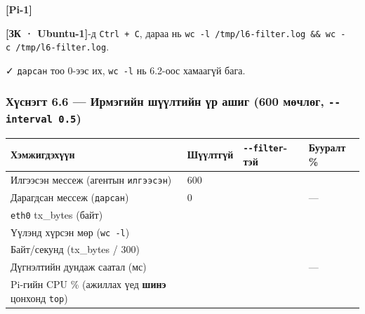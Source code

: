 \textbf{{[}Pi-1{]}}

\begin{Shaded}
\begin{Highlighting}[]
\VariableTok{)}
 \KeywordTok{\textbackslash{}}
    \KeywordTok{\textbackslash{}}
\VariableTok{)}
 \VariableTok{$((}\VariableTok{))} \KeywordTok{|} 
\end{Highlighting}
\end{Shaded}

\textbf{{[}ЗК · Ubuntu-1{]}}-д \texttt{Ctrl\ +\ C}, дараа нь \texttt{wc\ -l\ /\allowbreak{}tmp/\allowbreak{}l6-filter.\allowbreak{}log\ \&\allowbreak{}\&\allowbreak{}\ wc\ -c\ /\allowbreak{}tmp/\allowbreak{}l6-filter.\allowbreak{}log}.

✓ \texttt{дарсан} тоо 0-ээс их, \texttt{wc\ -l} нь 6.2-оос хамаагүй бага.

\hypertarget{ux445ux4afux441ux43dux44dux433ux442-6.6-ux438ux440ux43cux44dux433ux438ux439ux43d-ux448ux4afux4afux43bux442ux438ux439ux43d-ux4afux440-ux430ux448ux438ux433-600-ux43cux4e9ux447ux43bux4e9ux433---interval-0.5}{%
\subsubsection{\texorpdfstring{Хүснэгт 6.6 --- Ирмэгийн шүүлтийн үр ашиг (600 мөчлөг, \texttt{-\/\allowbreak{}-interval\ 0.\allowbreak{}5})}{Хүснэгт 6.6 --- Ирмэгийн шүүлтийн үр ашиг (600 мөчлөг, -\/-interval 0.5)}}\label{ux445ux4afux441ux43dux44dux433ux442-6.6-ux438ux440ux43cux44dux433ux438ux439ux43d-ux448ux4afux4afux43bux442ux438ux439ux43d-ux4afux440-ux430ux448ux438ux433-600-ux43cux4e9ux447ux43bux4e9ux433---interval-0.5}}

\begingroup\scriptsize\begin{longtable}[]{@{}llll@{}}
\toprule
Хэмжигдэхүүн & Шүүлтгүй & \texttt{-\/-filter}-тэй & Бууралт \%\tabularnewline
\midrule
\endhead
Илгээсэн мессеж (агентын \texttt{илгээсэн}) & 600 & &\tabularnewline
Дарагдсан мессеж (\texttt{дарсан}) & 0 & & ---\tabularnewline
\texttt{eth0} tx\_bytes (байт) & & &\tabularnewline
Үүлэнд хүрсэн мөр (\texttt{wc\ -l}) & & &\tabularnewline
Байт/секунд (tx\_bytes / 300) & & &\tabularnewline
Дүгнэлтийн дундаж саатал (мс) & & & ---\tabularnewline
Pi-гийн CPU \% (ажиллах үед \textbf{шинэ} цонхонд \texttt{top}) & & &\tabularnewline
\bottomrule
\end{longtable}\endgroup

